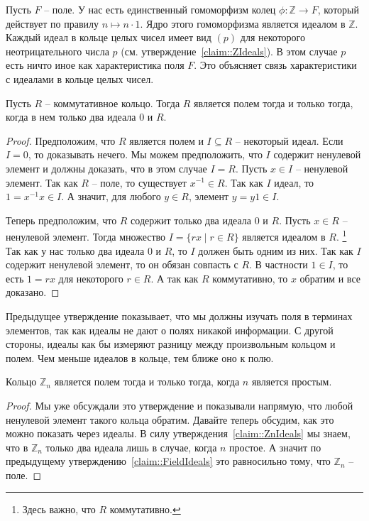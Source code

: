 \begin{remark}
Пусть $F$ -- поле.
У нас есть единственный гомоморфизм колец $\phi\colon \mathbb Z\to F$, который действует по правилу $n \mapsto n \cdot 1$.
Ядро этого гомоморфизма является идеалом в $\mathbb Z$.
Каждый идеал в кольце целых чисел имеет вид $(p)$ для некоторого неотрицательного числа $p$ (см. утверждение~\ref{claim::ZIdeals}).
В этом случае $p$ есть ничто иное как характеристика поля $F$.
Это объясняет связь характеристики с идеалами в кольце целых чисел.
\end{remark}

\begin{claim}
\label{claim::FieldIdeals}
Пусть $R$ -- коммутативное кольцо.
Тогда $R$ является полем тогда и только тогда, когда в нем только два идеала $0$ и $R$.
\end{claim}
\begin{proof}
Предположим, что $R$ является полем и $I\subseteq R$ -- некоторый идеал.
Если $I = 0$, то доказывать нечего.
Мы можем предположить, что $I$ содержит ненулевой элемент и должны доказать, что в этом случае $I = R$.
Пусть $x\in I$ -- ненулевой элемент.
Так как $R$ -- поле, то существует $x^{-1}\in R$.
Так как $I$ идеал, то $1 =x^{-1}x\in I$.
А значит, для любого $y\in R$, элемент $y = y 1 \in I$.

Теперь предположим, что $R$ содержит только два идеала $0$ и $R$.
Пусть $x\in R$ -- ненулевой элемент.
Тогда множество $I = \{rx \mid r\in R\}$ является идеалом в $R$.%
\footnote{Здесь важно, что $R$ коммутативно.}
Так как у нас только два идеала $0$ и $R$, то $I$ должен быть одним из них.
Так как $I$ содержит ненулевой элемент, то он обязан совпасть с $R$.
В частности $1\in I$, то есть $1 = rx$ для некоторого $r\in R$.
А так как $R$ коммутативно, то $x$ обратим и все доказано.
\end{proof}

Предыдущее утверждение показывает, что мы должны изучать поля в терминах элементов, так как идеалы не дают о полях никакой информации.
С другой стороны, идеалы как бы измеряют разницу между произвольным кольцом и полем.
Чем меньше идеалов в кольце, тем ближе оно к полю.

\begin{claim}
\label{claim::ZpField}
Кольцо $\mathbb Z_n$ является полем тогда и только тогда, когда $n$ является простым.
\end{claim}
\begin{proof}
Мы уже обсуждали это утверждение и показывали напрямую, что любой ненулевой элемент такого кольца обратим.
Давайте теперь обсудим, как это можно показать через идеалы.
В силу утверждения~\ref{claim::ZnIdeals} мы знаем, что в $\mathbb Z_n$ только два идеала лишь в случае, когда $n$ простое.
А значит по предыдущему утверждению~\ref{claim::FieldIdeals} это равносильно тому, что $\mathbb Z_n$ -- поле.
\end{proof}

